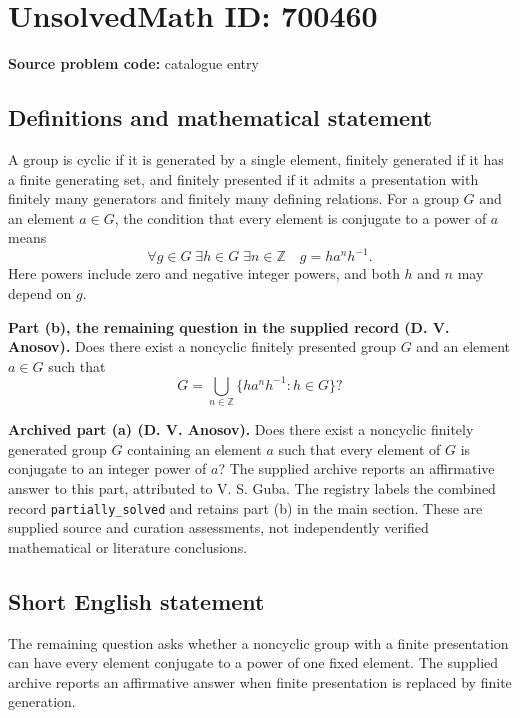 \documentclass[11pt]{article}
\newcommand{\Z}{\mathbb{Z}}
\begin{document}
\section*{UnsolvedMath ID: 700460}
\textbf{Source problem code:} catalogue entry
\subsection{Definitions and mathematical statement}
A group is cyclic if it is generated by a single element, finitely generated if it has a finite generating set, and finitely presented if it admits a presentation with finitely many generators and finitely many defining relations. For a group \(G\) and an element \(a\in G\), the condition that every element is conjugate to a power of \(a\) means
\[
\forall g\in G\;\exists h\in G\;\exists n\in\Z
\quad g=h a^n h^{-1}.
\]
Here powers include zero and negative integer powers, and both \(h\) and \(n\) may depend on \(g\).

\textbf{Part (b), the remaining question in the supplied record (D. V. Anosov).} Does there exist a noncyclic finitely presented group \(G\) and an element \(a\in G\) such that
\[
G=\bigcup_{n\in\Z}\{h a^n h^{-1}:h\in G\}?
\]

\textbf{Archived part (a) (D. V. Anosov).} Does there exist a noncyclic finitely generated group \(G\) containing an element \(a\) such that every element of \(G\) is conjugate to an integer power of \(a\)? The supplied archive reports an affirmative answer to this part, attributed to V. S. Guba. The registry labels the combined record \texttt{partially\_solved} and retains part (b) in the main section. These are supplied source and curation assessments, not independently verified mathematical or literature conclusions.
\subsection{Short English statement}
The remaining question asks whether a noncyclic group with a finite presentation can have every element conjugate to a power of one fixed element. The supplied archive reports an affirmative answer when finite presentation is replaced by finite generation.
\end{document}
